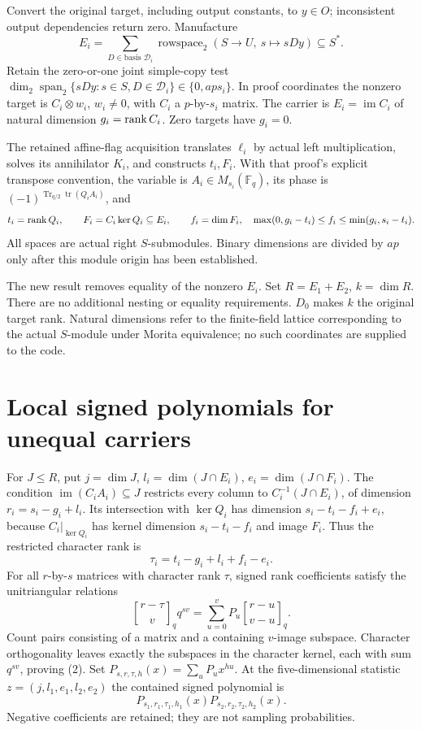 \documentclass[11pt]{article}
\newcommand{\F}{\mathbb F}\newcommand{\Hom}{\operatorname{Hom}}
\newcommand{\im}{\operatorname{im}}\newcommand{\gb}[2]{{#1\brack #2}_q}
\begin{document}
Convert the original target, including output constants, to $y\in O$;
inconsistent output dependencies return zero. Manufacture
\[
 E_i=\sum_{D\in\text{basis }\mathcal D_i}
 \operatorname{rowspace}_2(S\to U,\ s\mapsto sDy)\subseteq S^*.
\]
Retain the zero-or-one joint simple-copy test
$\dim_2\operatorname{span}_2\{sDy:s\in S,D\in\mathcal D_i\}
\in\{0,ap s_i\}$. In proof coordinates the nonzero target is
$C_i\otimes w_i$, $w_i\ne0$, with $C_i$ a $p$-by-$s_i$ matrix.
The carrier is $E_i=\im C_i$ of natural dimension $g_i=\operatorname{rank} C_i$.
Zero targets have $g_i=0$.

The retained affine-flag acquisition translates $\ell_i$ by actual left
multiplication, solves its annihilator $K_i$, and constructs $t_i,F_i$.
With that proof's explicit transpose convention, the variable is
$A_i\in M_{s_i}(\F_q)$, its phase is
$(-1)^{\operatorname{Tr}_{q/2}\operatorname{tr}(Q_iA_i)}$, and
\[
 t_i=\operatorname{rank} Q_i,\qquad F_i=C_i\ker Q_i\subseteq E_i,\qquad
 f_i=\dim F_i,\quad
 \max(0,g_i-t_i)\le f_i\le\min(g_i,s_i-t_i).
\]
All spaces are actual right $S$-submodules. Binary dimensions are divided
by $ap$ only after this module origin has been established.

The new result removes equality of the nonzero $E_i$. Set
$R=E_1+E_2$, $k=\dim R$. There are no additional nesting or equality
requirements. $D_0$ makes $k$ the original target rank. Natural dimensions
refer to the finite-field lattice corresponding to the actual $S$-module
under Morita equivalence; no such coordinates are supplied to the code.

\section{Local signed polynomials for unequal carriers}
For $J\le R$, put $j=\dim J$, $l_i=\dim(J\cap E_i)$,
$e_i=\dim(J\cap F_i)$. The condition $\im(C_iA_i)\subseteq J$
restricts every column to $C_i^{-1}(J\cap E_i)$, of dimension
$r_i=s_i-g_i+l_i$. Its intersection with $\ker Q_i$ has dimension
$s_i-t_i-f_i+e_i$, because $C_i|_{\ker Q_i}$ has kernel dimension
$s_i-t_i-f_i$ and image $F_i$. Thus the restricted character rank is
\[
 \tau_i=t_i-g_i+l_i+f_i-e_i.\tag{1}
\]
For all $r$-by-$s$ matrices with character rank $\tau$, signed rank
coefficients satisfy the unitriangular relations
\[
 \gb{r-\tau}{v}q^{sv}=\sum_{u=0}^{v}P_u\gb{r-u}{v-u}.
 \tag{2}
\]
Count pairs consisting of a matrix and a containing $v$-image subspace.
Character orthogonality leaves exactly the subspaces in the character
kernel, each with sum $q^{sv}$, proving (2). Set
$P_{s,r,\tau,h}(x)=\sum_uP_ux^{hu}$. At the five-dimensional statistic
$z=(j,l_1,e_1,l_2,e_2)$ the contained signed polynomial is
\[
 P_{s_1,r_1,\tau_1,h_1}(x)P_{s_2,r_2,\tau_2,h_2}(x).\tag{3}
\]
Negative coefficients are retained; they are not sampling probabilities.
\end{document}
